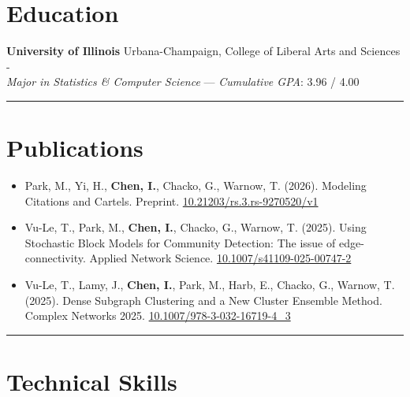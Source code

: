 \documentclass[11pt]{article}
\newcommand{\daterange}[4]{\formatdate{1}{#1}{#2} - \formatdate{1}{#3}{#4}}
\begin{document}

\section*{Education}
\vspace*{-2.5mm}

\textbf{University of Illinois} Urbana-Champaign, College of Liberal Arts and Sciences \hfill \daterange{8}{2023}{5}{2027} \\
\emph{Major in Statistics \& Computer Science} --- \emph{Cumulative GPA}: 3.96 / 4.00 \\

\vspace*{-5mm}
\rule{\textwidth}{0.1pt}
\vspace*{-10mm}

\section*{Publications}
\vspace*{-2.5mm}

\begin{itemize}
    \cramped
    \item Park, M., Yi, H., \textbf{Chen, I.}, Chacko, G., Warnow, T. (2026).
          Modeling Citations and Cartels.
          Preprint. \href{https://doi.org/10.21203/rs.3.rs-9270520/v1}{10.21203/rs.3.rs-9270520/v1}
    \item Vu-Le, T., Park, M., \textbf{Chen, I.}, Chacko, G., Warnow, T. (2025).
          Using Stochastic Block Models for Community Detection: The issue of edge-connectivity.
          Applied Network Science. \href{https://doi.org/10.1007/s41109-025-00747-2}{10.1007/s41109-025-00747-2}
    \item Vu-Le, T., Lamy, J., \textbf{Chen, I.}, Park, M., Harb, E., Chacko, G., Warnow, T. (2025).
          Dense Subgraph Clustering and a New Cluster Ensemble Method.
          Complex Networks 2025. \href{https://doi.org/10.1007/978-3-032-16719-4\_3}{10.1007/978-3-032-16719-4\_3}
\end{itemize}

\rule{\textwidth}{0.1pt}
\vspace*{-10mm}

\section*{Technical Skills}
\vspace*{-2.5mm}
\end{document}
